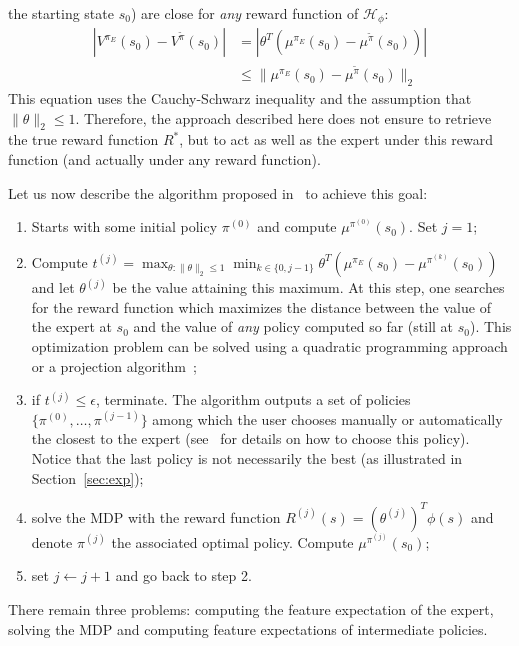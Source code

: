 \documentclass{jfpda2011}
\begin{document}
the starting state $s_0$) are close for \emph{any} reward function
of $\mathcal{H}_\phi$:
\begin{align}
  |V^{\pi_E}(s_0) - V^{\tilde{\pi}}(s_0)| &=
  |\theta^T(\mu^{\pi_E}(s_0)-\mu^{\tilde{\pi}}(s_0))|
  \label{eqn:vs0}
  \\
  &\leq \|\mu^{\pi_E}(s_0)-\mu^{\tilde{\pi}}(s_0)\|_2
\end{align}
This equation uses the Cauchy-Schwarz inequality and the
assumption that $\|\theta\|_2\leq 1$. Therefore, the approach
described here does not ensure to retrieve the true reward function
$R^*$, but to act as well as the expert under this reward function
(and actually under any reward function).

Let us now describe the algorithm proposed in~\citep{abbeel2004apprenticeship} to
achieve this goal:
\begin{enumerate}
  \item Starts with some initial policy $\pi^{(0)}$ and compute
  $\mu^{\pi^{(0)}}(s_0)$. Set $j=1$;
  \item Compute $t^{(j)} = \max_{\theta: \|\theta\|_2\leq 1}
  \min_{k\in\{0,j-1\}}\theta^T(\mu^{\pi_E}(s_0) -
  \mu^{\pi^{(k)}}(s_0))$ and let $\theta^{(j)}$ be the value
  attaining this maximum. At this step, one searches for the reward
  function which maximizes the distance between the value of the
  expert at $s_0$ and the value of \emph{any} policy computed so far
  (still at $s_0$). This optimization problem can be solved using a
  quadratic programming approach or a projection
  algorithm~\citep{abbeel2004apprenticeship};
  \item if $t^{(j)}\leq \epsilon$, terminate. The algorithm outputs a
  set of policies $\{\pi^{(0)}, \dots, \pi^{(j-1)}\}$ among which
  the user chooses manually or automatically the closest to the
  expert (see~\citep{abbeel2004apprenticeship} for details on how to choose this
  policy).
  Notice that the last policy is not necessarily the best (as illustrated in Section~\ref{sec:exp});
  \item solve the MDP with the reward function $R^{(j)}(s) =
  (\theta^{(j)})^T\phi(s)$ and denote $\pi^{(j)}$ the associated
  optimal policy. Compute $\mu^{\pi^{(j)}}(s_0)$;
  \item set $j\leftarrow j+1$ and go back to step 2.
\end{enumerate}
There remain three problems: computing the feature expectation of
the expert, solving the MDP and computing feature expectations of
intermediate policies.
\end{document}
